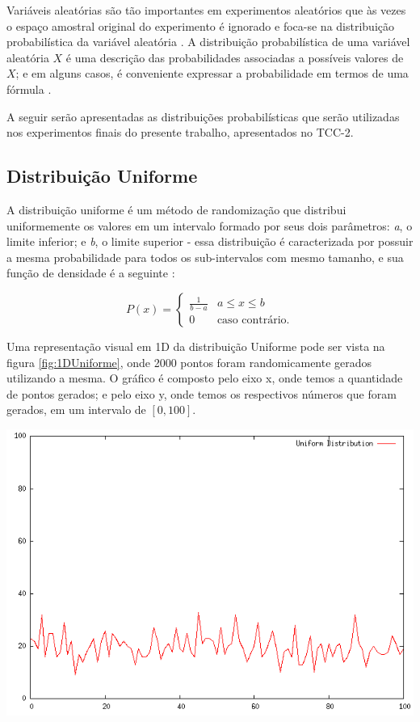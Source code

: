 Variáveis aleatórias são tão importantes em experimentos aleatórios que às vezes o espaço amostral original do experimento é ignorado e foca-se na distribuição probabilística da variável aleatória \cite{montgomery}. A distribuição probabilística de uma variável aleatória $X$ é uma descrição das probabilidades
associadas a possíveis valores de $X$; e em alguns casos, é conveniente expressar a probabilidade em termos de uma fórmula \cite{montgomery}.

A seguir serão apresentadas as distribuições probabilísticas que serão utilizadas nos experimentos finais do presente trabalho, apresentados no TCC-2.

\subsection{Distribuição Uniforme}
A distribuição uniforme é um método de randomização que distribui uniformemente os valores em um intervalo formado por seus dois parâmetros: \textit{a}, o limite inferior; e \textit{b}, o limite superior - essa distribuição é caracterizada por possuir a mesma probabilidade para todos os sub-intervalos com mesmo tamanho, e sua função de densidade é a seguinte \cite{fister}:

\begin{equation}
P(x) = 
\begin{cases}
    \frac{1}{b - a}    & \text{$a \leq x \leq b$}\\
    0 & \text{caso contrário.}
\end{cases}
\end{equation}

Uma representação visual em 1D da distribuição Uniforme pode ser vista na figura \ref{fig:1DUniforme}, onde 2000 pontos foram randomicamente gerados utilizando a mesma. O gráfico é composto pelo eixo x, onde temos a quantidade de pontos gerados; e pelo eixo y, onde temos os respectivos números que foram gerados, em um intervalo de $[0, 100]$.

{
    \centering
    \includegraphics[width=0.6\linewidth]{figuras/DistribuicaoUniforme.png}
    \label{fig:1DUniforme}
}

